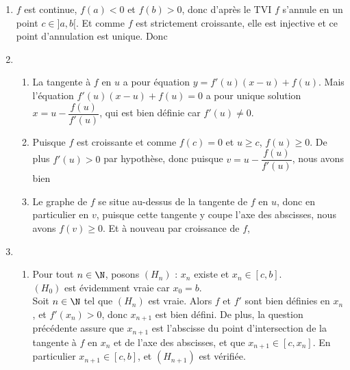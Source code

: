 \begin{enumerate}
\item $f$ est continue, $f(a)<0$ et $f(b)>0$, donc d'après le TVI $f$ s'annule en un point $c\in]a,b[$. Et comme $f$ est strictement croissante, elle est injective et ce point d'annulation est unique. Donc
\begin{center}
\fbox{$f$ s'annule en un unique point $c$ de $]a,b[$.}
\end{center}
\item 
\begin{enumerate}
\item La tangente à $f$ en $u$ a pour équation $y=f'(u)(x-u)+f(u)$. Mais l'équation $f'(u)(x-u)+f(u)=0$ a pour unique solution $x=u-\dfrac{f(u)}{f'(u)}$, qui est bien définie car $f'(u)\neq 0$.
\begin{center}
\end{center}
\item Puisque $f$ est croissante et comme $f(c)=0$ et $u\geq c$, $f(u)\geq0$. De plus $f'(u)>0$ par hypothèse, donc puisque $v=u-\dfrac{f(u)}{f'(u)}$, nous avons bien
\begin{center}
\end{center}
\item Le graphe de $f$ se situe au-dessus de la tangente de $f$ en $u$, donc en particulier en $v$, puisque cette tangente y coupe l'axe des abscisses, nous avons $f(v)\geq 0$. Et à nouveau par croissance de $f$,
\begin{center}
\end{center}
\begin{figure}[!h]
\begin{center}
\end{center}
\end{figure}
\end{enumerate}
\item
\begin{enumerate}
\item Pour tout $n\in\N$, posons $(H_n)$ : $x_n$ existe et $x_n\in[c,b]$.\\
$(H_0)$ est évidemment vraie car $x_0=b$.\\
Soit $n\in\N$ tel que $(H_n)$ est vraie. Alors $f$ et $f'$ sont bien définies en $x_n$, et $f'(x_n)>0$, donc $x_{n+1}$ est bien défini. De plus, la question précédente assure que $x_{n+1}$ est l'abscisse du point d'intersection de la tangente à $f$ en $x_n$ et de l'axe des abscisses, et que $x_{n+1}\in[c,x_n]$. En particulier $x_{n+1}\in[c,b]$, et $(H_{n+1})$ est vérifiée.

\end{enumerate}
\end{enumerate}
